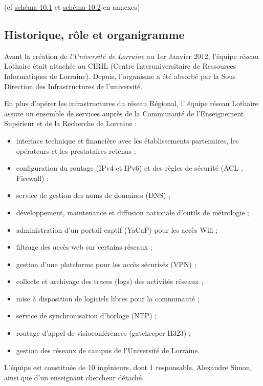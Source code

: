 \documentclass[a4paper,12pt,one side,titlepage]{report}
\begin{document}
(cf \hyperref[fig:imagereseaulothaire1]{schéma 10.1}  et \hyperref[fig:imagereseaulothaire1]{schéma 10.2} 
en annexes)

\subsection{Historique, rôle et organigramme}

Avant la création de \emph{l'Université de Lorraine} au 1er Janvier 2012, l'équipe
réseau Lothaire était attachée au CIRIL (Centre Interuniversitaire de Ressources Informatiques
de Lorraine). Depuis, l'organisme a été absorbé par la Sous Direction des Infrastructures
de l'université.

En plus d’opérer les infrastructures du réseau Régional, l’ équipe réseau Lothaire 
assure un ensemble de services auprès de la Communauté de l’Enseignement Supérieur 
et de la Recherche de Lorraine :

\begin{itemize}
    \item interface technique et financière avec les établissements partenaires, 
    les opérateurs et les prestataires retenus ;
    \item configuration du routage (IPv4 et IPv6) et des règles de sécurité (ACL , 
    Firewall) ;
    \item service de gestion des noms de domaines (DNS) ;
    \item développement, maintenance et diffusion nationale d’outils de métrologie  ;
    \item administration d’un portail captif (YaCaP) pour les accès Wifi ;
    \item filtrage des accès web sur certains réseaux ;
    \item gestion d’une plateforme pour les accès sécurisés (VPN) ;
    \item collecte et archivage des traces (logs) des activités réseaux ;
    \item mise à disposition de logiciels libres pour la communauté ;
    \item service de synchronisation d’horloge (NTP) ;
    \item routage d’appel de visioconférences (gatekeeper H323) ;
    \item gestion des réseaux de campus de l’Université de Lorraine.
\end{itemize}                                                

L'équipe est constituée de 10 ingénieurs, dont 1 responsable, Alexandre Simon, ainsi
que d'un enseignant chercheur détaché.
\end{document}
